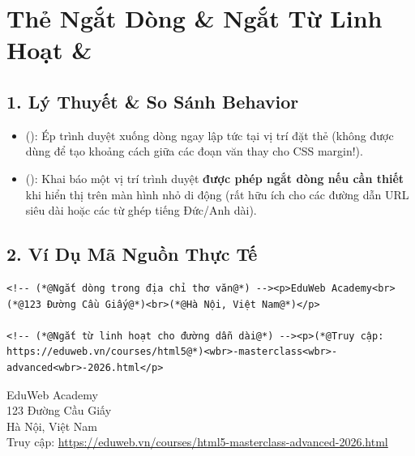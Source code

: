 \section{Thẻ Ngắt Dòng \& Ngắt Từ Linh Hoạt  \& }
\subsection{1. Lý Thuyết \& So Sánh Behavior}
\begin{itemize}
    \item {} (): Ép trình duyệt xuống dòng ngay lập tức tại vị trí đặt thẻ (không được dùng  để tạo khoảng cách giữa các đoạn văn thay cho CSS margin!).
    \item {} (): Khai báo một vị trí trình duyệt \textbf{được phép ngắt dòng nếu cần thiết} khi hiển thị trên màn hình nhỏ di động (rất hữu ích cho các đường dẫn URL siêu dài hoặc các từ ghép tiếng Đức/Anh dài).
\end{itemize}

\subsection{2. Ví Dụ Mã Nguồn Thực Tế}
\begin{codeWindow}
\begin{lstlisting}[language=HTML5]
<!-- (*@Ngắt dòng trong địa chỉ thơ văn@*) --><p>EduWeb Academy<br>(*@123 Đường Cầu Giấy@*)<br>(*@Hà Nội, Việt Nam@*)</p>

<!-- (*@Ngắt từ linh hoạt cho đường dẫn dài@*) --><p>(*@Truy cập: https://eduweb.vn/courses/html5@*)<wbr>-masterclass<wbr>-advanced<wbr>-2026.html</p>
\end{lstlisting}
\end{codeWindow}

\begin{browserWindow}
\sffamily\small
EduWeb Academy\\
123 Đường Cầu Giấy\\
Hà Nội, Việt Nam\\[6pt]
Truy cập: \textcolor{primaryBlue}{\underline{https://eduweb.vn/courses/html5-masterclass-advanced-2026.html}}
\end{browserWindow}

